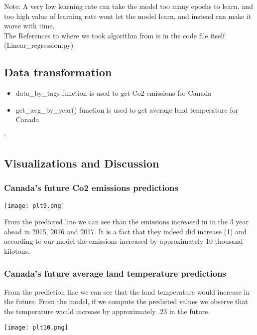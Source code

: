 \documentclass[a4paper, 11pt]{report}
\begin{document}
Note: A very low learning rate can take the model too many epochs to learn,
   and too high value of learning rate wont let the model learn, and instead can
   make it worse with time. \\

   The References to where we took algorithm from is in the code file itself (Linear\_regression.py)

\newpage

\subsection{Data transformation}

\begin{itemize}
    \item data\_by\_tags function is used to get Co2 emissions for Canada

    \item get\_avg\_by\_year() function is used to get average land temperature for Canada
\end{itemize}
`\\

\subsection{Visualizations and Discussion}


\subsubsection{Canada's future Co2 emissions predictions}

\begin{multicols}{2}
  \texttt{[image: plt9.png]}

  From the predicted line we can see than the emissions increased in in the 3 year ahead in 2015, 2016 and 2017. It is a fact that they indeed did increase (1) and according to our model the emissions increased by approximately 10 thousand kilotons.
\end{multicols}


\subsubsection{Canada's future average land temperature predictions}

\begin{multicols}{2}
  From the prediction line we can see that the land temperature would increase in the future. From the model, if we compute the predicted values we observe that the temperature would increase by approximately .23 in the future.

  \texttt{[image: plt10.png]}
\end{multicols}
~\\
\end{document}
